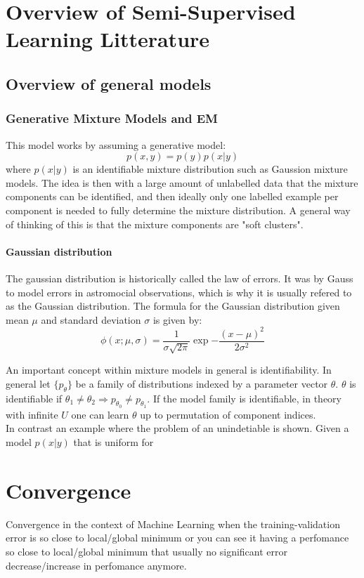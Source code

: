 \documentclass[10pt, letterpaper]{article}
\begin{document}
\section{Overview of Semi-Supervised Learning Litterature}
\subsection{Overview of general models}
\subsubsection{Generative Mixture Models and EM}
This model works by assuming a generative model:
$$
    p(x, y) = p(y)p(x|y)
$$
where $p(x|y)$ is an identifiable mixture distribution such as Gaussion mixture models. The idea is then with a large amount of unlabelled data that the mixture components can be identified, and then ideally only one labelled example per component is needed to fully determine the mixture distribution. A general way of thinking of this is that the mixture components are "soft clusters".



\paragraph{Gaussian distribution}
The gaussian distribution is historically called the law of errors. It was by Gauss to model errors in astromocial observations, which is why it is usually refered to as the Gaussian distribution. The formula for the Gaussian distribution given mean $\mu$ and standard deviation $\sigma$ is given by:
$$
    \phi(x; \mu, \sigma) = \frac{1}{\sigma \sqrt{2 \pi}} \exp{-\frac{(x-\mu)^2}{2\sigma^2}}
$$

An important concept within mixture models in general is identifiability. In general let $\{p_\theta\}$ be a family of distributions indexed by a parameter vector $\theta$. $\theta$ is identifiable if $\theta_1 \neq \theta_2 \Rightarrow p_{\theta_0} \neq p_{\theta_1}$. If the model family is identifiable, in theory with infinite $U$ one can learn $\theta$ up to permutation of component indices.\\
In contrast an example where the problem of an unindetiable is shown. Given a model $p(x|y)$ that is uniform for

\section{Convergence}
Convergence in the context of Machine Learning when the training-validation error is so close to local/global minimum or you can see it having a perfomance so close to local/global minimum that usually no significant error decrease/increase in perfomance anymore.
\end{document}
